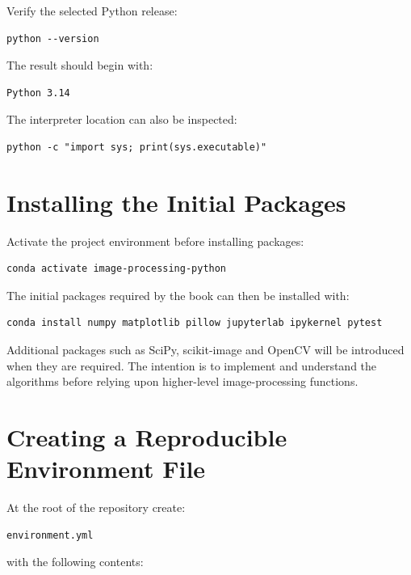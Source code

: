 Verify the selected Python release:

\begin{verbatim}
python --version
\end{verbatim}

The result should begin with:

\begin{verbatim}
Python 3.14
\end{verbatim}

The interpreter location can also be inspected:

\begin{verbatim}
python -c "import sys; print(sys.executable)"
\end{verbatim}


\section{Installing the Initial Packages}
\label{sec:install-packages}

Activate the project environment before installing packages:

\begin{verbatim}
conda activate image-processing-python
\end{verbatim}

The initial packages required by the book can then be installed with:

\begin{verbatim}
conda install numpy matplotlib pillow jupyterlab ipykernel pytest
\end{verbatim}

Additional packages such as SciPy, scikit-image and OpenCV will be
introduced when they are required. The intention is to implement and
understand the algorithms before relying upon higher-level
image-processing functions.


\section{Creating a Reproducible Environment File}
\label{sec:environment-yml}

At the root of the repository create:

\begin{verbatim}
environment.yml
\end{verbatim}

with the following contents:


